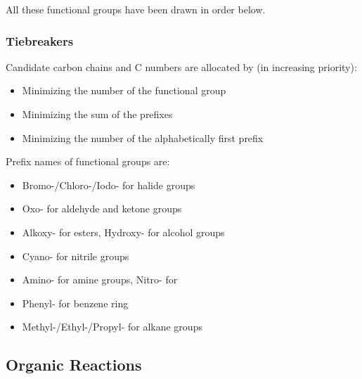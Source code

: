 \documentclass[../main]{subfiles}
\begin{document}
	All these functional groups have been drawn in order below.

	\begin{figure}[H]
	\end{figure}
	\begin{figure}[H]
	\end{figure}
	\begin{figure}[H]
	\end{figure}

	\subsubsection{Tiebreakers}

	Candidate carbon chains and C numbers are allocated by (in increasing priority):
	\begin{itemize}
		\item Minimizing the number of the functional group
		\item Minimizing the sum of the prefixes
		\item Minimizing the number of the alphabetically first prefix
	\end{itemize}

	Prefix names of functional groups are:
	\begin{itemize}
		\item Bromo-/Chloro-/Iodo- for halide groups
		\item Oxo- for aldehyde and ketone groups
		\item Alkoxy- for esters, Hydroxy- for alcohol groups
		\item Cyano- for nitrile groups
		\item Amino- for amine groups, Nitro- for 
		\item Phenyl- for benzene ring
		\item Methyl-/Ethyl-/Propyl- for alkane groups
	\end{itemize}

	\subsection{Organic Reactions}
\end{document}
